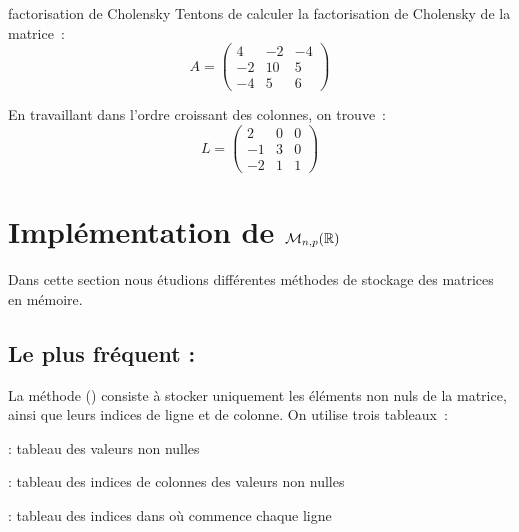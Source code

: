\begin{exemple}{}{factorisation de Cholensky}
    Tentons de calculer la factorisation de Cholensky de la matrice~:
    $$A = \begin{pmatrix}
        4 & -2 & -4 \\
        -2 & 10 & 5 \\
        -4 & 5 & 6
    \end{pmatrix}$$

    En travaillant dans l'ordre croissant des colonnes, on trouve~:
    $$L = \begin{pmatrix}
        2 & 0 & 0\\
        -1 & 3 & 0\\
        -2 & 1 & 1
    \end{pmatrix}$$
\end{exemple}


\section{Implémentation de $\mathcal{M}_{n,p}(\mathbb{R})$}

Dans cette section nous étudions différentes méthodes de stockage des matrices en mémoire.

\subsection{Le plus fréquent : }

La méthode  () consiste à stocker uniquement les éléments non nuls de la matrice, ainsi que leurs indices de ligne et de colonne. On utilise trois tableaux~:
\begin{enumeratebf}
    \item {} : tableau des valeurs non nulles
    \item {} : tableau des indices de colonnes des valeurs non nulles
    \item {} : tableau des indices dans  où commence chaque ligne
\end{enumeratebf}

